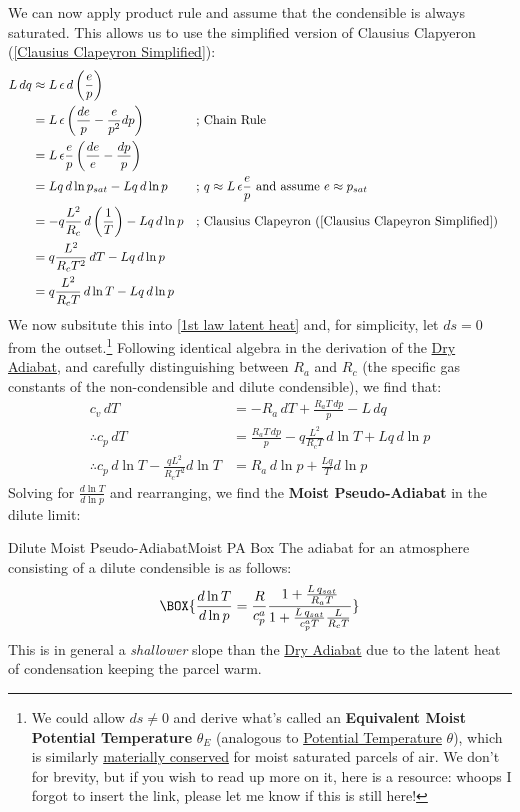 We can now apply product rule and assume that the condensible is always saturated. This allows us to use the simplified version of Clausius Clapyeron (\ref{Clausius Clapeyron Simplified}):
\begin{align*}
    L\,dq &\approx L \,\epsilon \,d \left( \frac{e}{p} \right)\\
    &= L \, \epsilon \left( \frac{de}{p} - \frac{e}{p^2}dp \right)
    &\text{; }
    &\text{Chain Rule}
    \\
    &= L\,\epsilon\frac{e}{p}\left( \frac{de}{e} - \frac{dp}{p} \right)
    \\
    &=Lq\,d\ln p_{sat}-Lq\,d\ln p
    &\text{; }
    &q\approx L\,\epsilon \frac{e}{p} \text{ and assume } e\approx p_{sat}
    \\
    &=-q\frac{L^2}{R_c}\,d\left( \frac{1}{T} \right)-Lq\,d\ln p
    &\text{; }
    &\text{Clausius Clapeyron (\ref{Clausius Clapeyron Simplified})}\\
    &=q\frac{L^2}{R_c T^2}\,dT-Lq\,d\ln p\\
    &=q\frac{L^2}{R_cT}\,d\ln T-Lq\,d\ln p
\end{align*}
We now subsitute this into \ref{1st law latent heat} and, for simplicity, let $ds=0$ from the outset.\footnote{We could allow $ds\neq 0$ and derive what's called an \textbf{Equivalent Moist Potential Temperature} $\theta_E$ (analogous to \hyperref[Potential Temperature]{Potential Temperature} $\theta$), which is similarly \hyperref[Material Conservation]{materially conserved} for moist saturated parcels of air. We don't for brevity, but if you wish to read up more on it, here is a resource: whoops I forgot to insert the link, please let me know if this is still here!} Following identical algebra in the derivation of the \hyperref[Dry Adiabat]{Dry Adiabat}, and carefully distinguishing between $R_a$ and $R_c$ (the specific gas constants of the non-condensible and dilute condensible), we find that:
\begin{align*}
    c_v\,dT & =-R_a\,dT+\frac{R_aT\,dp}{p}-L\,dq\\
    \therefore c_p\,dT &= \frac{R_a T\,dp}{p} - q\frac{L^2}{R_cT}\,d\ln T+Lq\,d\ln p\\
    \therefore c_p\,d\ln T - \frac{q L^2}{R_c T^2}d\ln T&=R_a\,d\ln p + \frac{Lq}{T}d\ln p
\end{align*}
Solving for $\frac{d\ln T}{d\ln p}$ and rearranging, we find the \textbf{Moist Pseudo-Adiabat} in the dilute limit:
\begin{fact}{Dilute Moist Pseudo-Adiabat}{Moist PA Box}\label{Moist PA Box}
    The adiabat for an atmosphere consisting of a dilute condensible is as follows:
    \begin{align}\label{dilute moist adiabat}
        \BOX{\frac{d\ln T}{d\ln p}=\frac{R}{c_p^a}\frac{1+\frac{L\,q_{sat}}{R_aT}}{1+\frac{L\,q_{sat}}{c_p^aT}\frac{L}{R_cT}}}
    \end{align}
    This is in general a \textit{shallower} slope than the \hyperref[Dry Adiabat Box]{Dry Adiabat} due to the latent heat of condensation keeping the parcel warm.
\end{fact}
